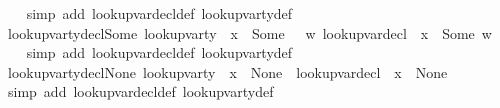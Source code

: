 \begin{isabellebody}
%
\isadelimproof
\ \ %
\endisadelimproof
%
\isatagproof
{}\isamarkupfalse%
\ {\isacharparenleft}{\kern0pt}simp\ add{\isacharcolon}{\kern0pt}\ lookup{\isacharunderscore}{\kern0pt}var{\isacharunderscore}{\kern0pt}decl{\isacharunderscore}{\kern0pt}def\ lookup{\isacharunderscore}{\kern0pt}var{\isacharunderscore}{\kern0pt}ty{\isacharunderscore}{\kern0pt}def{\isacharparenright}{\kern0pt}%
\endisatagproof
{\isafoldproof}%
%
\isadelimproof
\isanewline
%
\endisadelimproof
\isanewline
{}\isamarkupfalse%
\ lookup{\isacharunderscore}{\kern0pt}var{\isacharunderscore}{\kern0pt}ty{\isacharunderscore}{\kern0pt}decl{\isacharunderscore}{\kern0pt}Some{\isacharcolon}{\kern0pt}\ {\isachardoublequoteopen}lookup{\isacharunderscore}{\kern0pt}var{\isacharunderscore}{\kern0pt}ty\ {\isasymLambda}\ x\ {\isacharequal}{\kern0pt}\ Some\ {\isasymtau}\ {\isasymLongrightarrow}\ {\isasymexists}w{\isachardot}{\kern0pt}\ lookup{\isacharunderscore}{\kern0pt}var{\isacharunderscore}{\kern0pt}decl\ {\isasymLambda}\ x\ {\isacharequal}{\kern0pt}\ Some\ {\isacharparenleft}{\kern0pt}{\isasymtau}{\isacharcomma}{\kern0pt}w{\isacharparenright}{\kern0pt}{\isachardoublequoteclose}\isanewline
%
\isadelimproof
\ \ %
\endisadelimproof
%
\isatagproof
{}\isamarkupfalse%
\ {\isacharparenleft}{\kern0pt}simp\ add{\isacharcolon}{\kern0pt}\ lookup{\isacharunderscore}{\kern0pt}var{\isacharunderscore}{\kern0pt}decl{\isacharunderscore}{\kern0pt}def\ lookup{\isacharunderscore}{\kern0pt}var{\isacharunderscore}{\kern0pt}ty{\isacharunderscore}{\kern0pt}def{\isacharparenright}{\kern0pt}%
\endisatagproof
{\isafoldproof}%
%
\isadelimproof
\isanewline
%
\endisadelimproof
\isanewline
{}\isamarkupfalse%
\ lookup{\isacharunderscore}{\kern0pt}var{\isacharunderscore}{\kern0pt}ty{\isacharunderscore}{\kern0pt}decl{\isacharunderscore}{\kern0pt}None{\isacharcolon}{\kern0pt}\ {\isachardoublequoteopen}lookup{\isacharunderscore}{\kern0pt}var{\isacharunderscore}{\kern0pt}ty\ {\isasymLambda}\ x\ {\isacharequal}{\kern0pt}\ None\ {\isasymLongrightarrow}\ lookup{\isacharunderscore}{\kern0pt}var{\isacharunderscore}{\kern0pt}decl\ {\isasymLambda}\ x\ {\isacharequal}{\kern0pt}\ None{\isachardoublequoteclose}\isanewline
%
\isadelimproof
\ \ %
\endisadelimproof
%
\isatagproof
{}\isamarkupfalse%
\ {\isacharparenleft}{\kern0pt}simp\ add{\isacharcolon}{\kern0pt}\ lookup{\isacharunderscore}{\kern0pt}var{\isacharunderscore}{\kern0pt}decl{\isacharunderscore}{\kern0pt}def\ lookup{\isacharunderscore}{\kern0pt}var{\isacharunderscore}{\kern0pt}ty{\isacharunderscore}{\kern0pt}def{\isacharparenright}{\kern0pt}%

\end{isabellebody}
